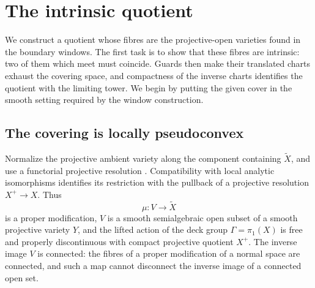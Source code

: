 \section{The intrinsic quotient}\label{sec:quo-section}

We construct a quotient whose fibres are the projective-open varieties found in the boundary windows. The first task is to show that these fibres are intrinsic: two of them which meet must coincide. Guards then make their translated charts exhaust the covering space, and compactness of the inverse charts identifies the quotient with the limiting tower. We begin by putting the given cover in the smooth setting required by the window construction.

\subsection{The covering is locally pseudoconvex}

Normalize the projective ambient variety along the component containing $\widetilde X$, and use a functorial projective resolution \cite[Theorem~1.1]{BierstoneMilman2008}. Compatibility with local analytic isomorphisms identifies its restriction with the pullback of a projective resolution $X^+\to X$. Thus
\[
 \mu:V\longrightarrow\widetilde X
\]
is a proper modification, $V$ is a smooth semialgebraic open subset of a smooth projective variety $Y$, and the lifted action of the deck group $\Gamma=\pi_1(X)$ is free and properly discontinuous with compact projective quotient $X^+$. The inverse image $V$ is connected: the fibres of a proper modification of a normal space are connected, and such a map cannot disconnect the inverse image of a connected open set.

